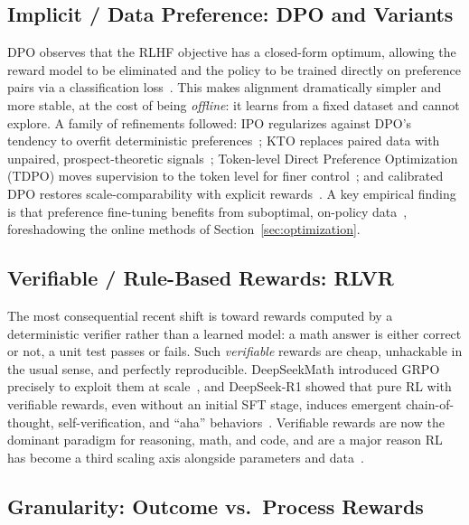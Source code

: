 \subsection{Implicit / Data Preference: DPO and Variants}

DPO observes that the RLHF objective has a closed-form optimum, allowing
the reward model to be eliminated and the policy to be trained directly
on preference pairs via a classification loss~\cite{rafailov2023dpo}.
This makes alignment dramatically simpler and more stable, at the cost of
being \emph{offline}: it learns from a fixed dataset and cannot explore.
A family of refinements followed: IPO regularizes against DPO's tendency
to overfit deterministic preferences~\cite{azar2024ipo}; KTO replaces
paired data with unpaired, prospect-theoretic
signals~\cite{ethayarajh2024kto}; Token-level Direct Preference
Optimization (TDPO) moves supervision to the token level for finer
control~\cite{zeng2024tdpo}; and calibrated DPO restores
scale-comparability with explicit rewards~\cite{liu2024caldpo}.  A key
empirical finding is that preference fine-tuning benefits from
suboptimal, on-policy data~\cite{tajwar2024preference}, foreshadowing the
online methods of Section~\ref{sec:optimization}.

\subsection{Verifiable / Rule-Based Rewards: RLVR}

The most consequential recent shift is toward rewards computed by a
deterministic verifier rather than a learned model: a math answer is
either correct or not, a unit test passes or fails.  Such
\emph{verifiable} rewards are cheap, unhackable in the usual sense, and
perfectly reproducible.  DeepSeekMath introduced GRPO precisely to
exploit them at scale~\cite{shao2024deepseekmath}, and DeepSeek-R1 showed
that pure RL with verifiable rewards, even without an initial SFT stage,
induces emergent chain-of-thought, self-verification, and ``aha''
behaviors~\cite{guo2025deepseekr1}.  Verifiable rewards are now the
dominant paradigm for reasoning, math, and code, and are a major reason
RL has become a third scaling axis alongside parameters and
data~\cite{snell2024testtime,openai2024o1,muennighoff2025s1}.

\subsection{Granularity: Outcome vs.\ Process Rewards}

